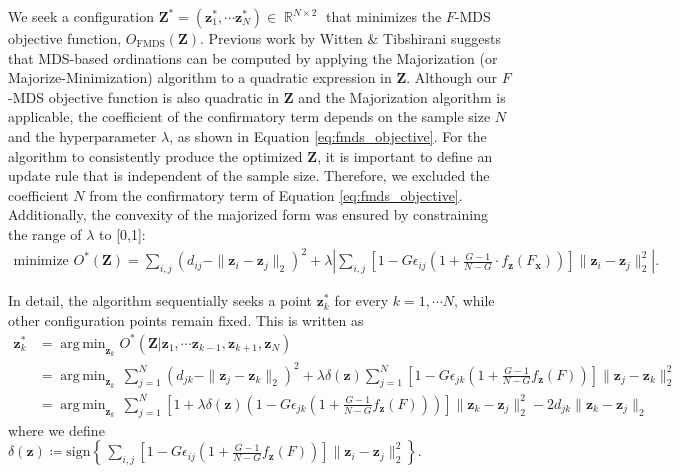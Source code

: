 \documentclass[11pt]{article}
\newcommand{\1}{{\rm 1}\kern-0.24em{\rm I}}
\DeclareMathOperator*{\argmin}{arg\,min}
\DeclareMathOperator*{\bbr}{\mathbb{R}}
\begin{document}
We seek a configuration $\mathbf{Z^*}= (\mathbf{z}_1^*, \cdots \mathbf{z}_N^*)\in \bbr^{N\times 2}$ that minimizes the $F$-MDS objective function, $O_{\text{FMDS}}(\mathbf{Z})$.
Previous work by Witten \& Tibshirani \cite{witten11} suggests that MDS-based ordinations can be computed by applying the Majorization (or Majorize-Minimization) algorithm to a quadratic expression in $\mathbf{Z}$. 
Although our $F$-MDS objective function is also quadratic in $\mathbf{Z}$ and the Majorization algorithm is applicable, the coefficient of the confirmatory term depends on the sample size $N$ and the hyperparameter $\lambda$, as shown in Equation \ref{eq:fmds_objective}.
For the algorithm to consistently produce the optimized $\mathbf{Z}$, it is important to define an update rule that is independent of the sample size. Therefore, we excluded the coefficient $N$ from the confirmatory term of Equation \ref{eq:fmds_objective}. Additionally, the convexity of the majorized form was ensured by constraining the range of $\lambda$ to [0,1]:
\begin{align*}
\text{minimize } O^* (\mathbf{Z}) = \sum_{i,j} (d_{ij} - \| \mathbf{z}_i - \mathbf{z}_j \|_2 )^2 + \lambda \left|\sum_{i,j} \left[1- G\epsilon_{ij} \left(1+\frac{G-1}{N-G}\cdot{f_\mathbf{z}(F_\mathbf{x})}\right)\right] \|\mathbf{z}_i - \mathbf{z}_j\|_2^2\right|.
\end{align*}

In detail, the algorithm sequentially seeks a point $\mathbf{z}_k^*$ for every $k=1,\cdots N$, while other configuration points remain fixed. This is written as
\begingroup
\allowdisplaybreaks
\begin{align}
\mathbf{z}_k^* 
&= \argmin_{\mathbf{z}_k}O^*(\mathbf{Z} | \mathbf{z}_1,\cdots \mathbf{z}_{k-1}, \mathbf{z}_{k+1}, \mathbf{z}_N) \\
&= \argmin_{\mathbf{z}_k}\, \sum_{j=1}^N (d_{jk} - \|\mathbf{z}_j - \mathbf{z}_k\|_2)^2 + \lambda\delta(\mathbf{z})\sum_{j=1}^N \left[1- G\epsilon_{jk} \left(1 + \frac{G-1}{N-G}{f_\mathbf{z}(F)}\right)\right] \|\mathbf{z}_j - \mathbf{z}_k\|_2^2 \\
&= \argmin_{\mathbf{z}_k}\, \sum_{j=1}^N \left[1+\lambda\delta(\mathbf{z}) \left(1- G\epsilon_{jk} \left(1+ \frac{G-1}{N-G}{f_\mathbf{z}(F)} \right)\right) \right] \|\mathbf{z}_k-\mathbf{z}_j\|_2^2 - 2d_{jk}\|\mathbf{z}_k-\mathbf{z}_j\|_2
\label{eq:appc_mm1}
\end{align}
\endgroup
where we define $\delta (\mathbf{z}) \coloneqq \text{sign}\left\{\,\sum_{i,j} \left[1- G \epsilon_{ij} \left(1 + \frac{G-1}{N-G}{f_\mathbf{z}(F)} \right)\right] \|\mathbf{z}_i - \mathbf{z}_j\|_2^2\right\}$.
\end{document}

